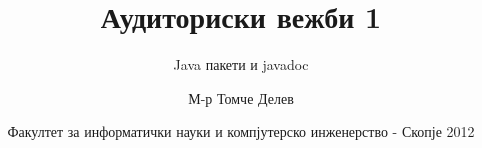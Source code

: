 

\author[АВ1]{М-р Томче Делев}
\title[Напредно програмирање]{Аудиториски вежби 1}
\subtitle{Java пакети и javadoc}
\date{Факултет за информатички науки и компјутерско инженерство - Скопје 2012}





\frame[t,plain]{\titlepage}









